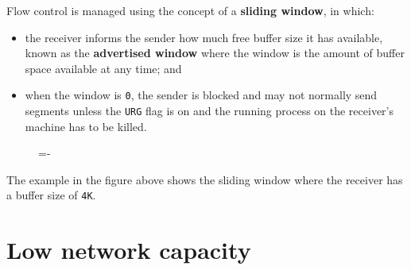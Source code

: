 \documentclass[a4paper]{systems-software}
\begin{document}
Flow control is managed using the concept of a \textbf{sliding window}, in which:
\begin{itemize}
	\item the receiver informs the sender how much free buffer size it has available, known as the \textbf{advertised window} where the window is the amount of buffer space available at any time; and
	\item when the window is \texttt{0}, the sender is blocked and may not normally send segments unless the \texttt{URG} flag is on and the running process on the receiver's machine has to be killed.
\end{itemize}

\begin{figure}[H]
	\lineskip=-\fboxrule
\end{figure}

The example in the figure above shows the sliding window where the receiver has a buffer size of \texttt{4K}.


\section*{Low network capacity}
\end{document}
